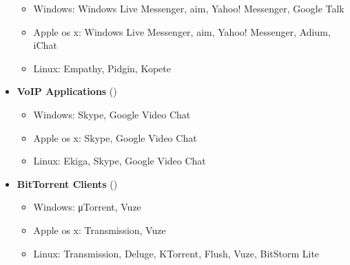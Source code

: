 \begin{eng}
\begin{itemize}
		\begin{itemize}
			\item Windows: Windows Live Messenger, aim, Yahoo! Messenger, Google Talk
			\item Apple os x: Windows Live Messenger, aim, Yahoo! Messenger, Adium, iChat
			\item Linux: Empathy, Pidgin, Kopete
		\end{itemize}
		\item \textbf{VoIP Applications} ()
		\begin{itemize}
			\item Windows: Skype, Google Video Chat
			\item Apple os x: Skype, Google Video Chat
			\item Linux: Ekiga, Skype, Google Video Chat
		\end{itemize}
		\item \textbf{BitTorrent Clients} ()
		\begin{itemize}
			\item Windows: μTorrent, Vuze
			\item Apple os x: Transmission, Vuze
			\item Linux: Transmission, Deluge, KTorrent, Flush, Vuze, BitStorm Lite
		\end{itemize}
	\end{itemize}
\end{eng}
